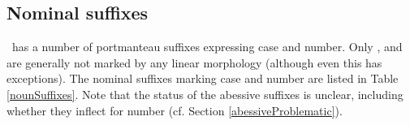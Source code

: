 \subsection{Nominal suffixes}\label{nominalSuffixes}
\PS\ has a number of portmanteau suffixes expressing case and number. %
Only ,  and  are generally %
not marked by any linear morphology (although even this has exceptions). The nominal suffixes marking case and number are listed in Table \vref{nounSuffixes}. Note that the status of the abessive suffixes is unclear, including whether they inflect for number (cf. Section \ref{abessiveProblematic}).
